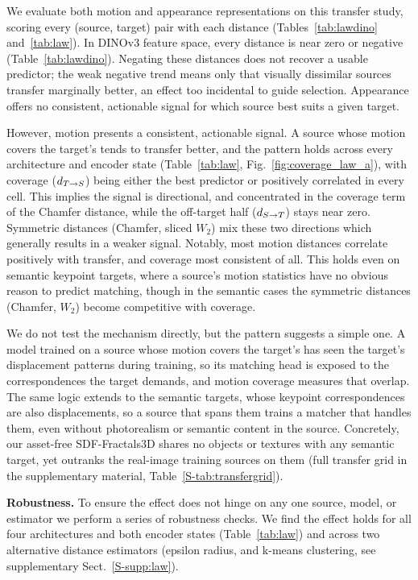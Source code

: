 We evaluate both motion and appearance representations on this transfer study,
scoring every (source, target) pair with each distance (Tables~\ref{tab:lawdino}
and~\ref{tab:law}). In DINOv3 feature space, every distance is near zero or negative (Table~\ref{tab:lawdino}). Negating these distances
does not recover a usable predictor; the weak negative trend means only that visually
dissimilar sources transfer marginally better, an effect too incidental to guide
selection. Appearance offers no consistent, actionable signal for which source best suits a given target.

However, motion presents a consistent, actionable signal. A source whose motion covers
the target's tends to transfer better, and the pattern holds across every architecture and
encoder state (Table~\ref{tab:law}, Fig.~\ref{fig:coverage_law_a}), with coverage
($d_{T\to S}$) being either the best predictor or positively correlated in every cell. This implies the signal is directional, and concentrated in
the coverage term of the Chamfer distance, while the off-target half ($d_{S\to T}$) stays near zero. Symmetric
distances (Chamfer, sliced $W_2$) mix these two directions which generally results in a weaker signal.
Notably, most motion distances correlate positively with transfer, and coverage most consistent of all. This holds even on semantic keypoint targets, where a source's motion
statistics have no obvious reason to predict matching, though in the semantic cases the symmetric
distances (Chamfer, $W_2$) become competitive with coverage.

We do not test the mechanism directly, but the pattern suggests a simple one. A model
trained on a source whose motion covers the target's has seen the target's
displacement patterns during training, so its matching head is exposed to the
correspondences the target demands, and motion coverage measures that overlap. The same
logic extends to the semantic targets, whose keypoint correspondences are also
displacements, so a source that spans them trains a matcher that handles them, even
without photorealism or semantic content in the source. Concretely, our asset-free SDF-Fractals3D shares no objects or textures with any semantic target, yet outranks the real-image training sources on them (full transfer grid in the supplementary material, Table~\ref{S-tab:transfergrid}). 

\noindent\textbf{Robustness.} To ensure the effect does not hinge on any one source, model, or
estimator we perform a series of robustness checks. We find the effect holds for all four architectures and both encoder states
(Table~\ref{tab:law}) and across two alternative distance estimators (epsilon radius, and k-means clustering, see supplementary Sect.~\ref{S-supp:law}). 

